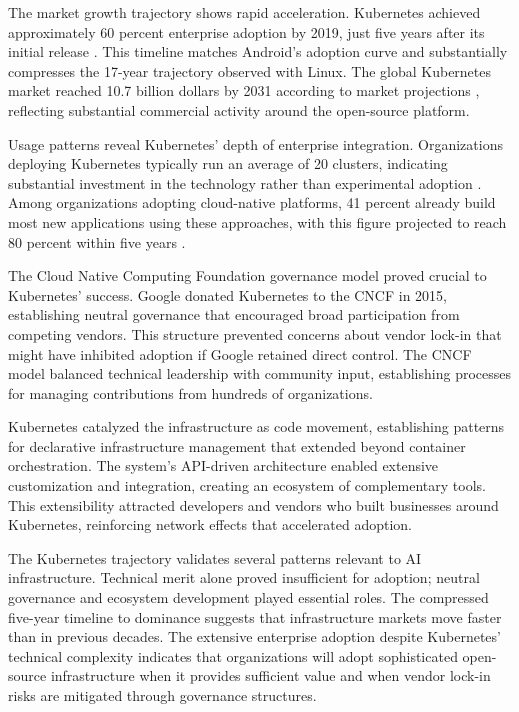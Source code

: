 The market growth trajectory shows rapid acceleration. Kubernetes achieved approximately 60 percent enterprise adoption by 2019, just five years after its initial release \cite{kubernetes_datahub2024}. This timeline matches Android's adoption curve and substantially compresses the 17-year trajectory observed with Linux. The global Kubernetes market reached 10.7 billion dollars by 2031 according to market projections \cite{kubernetes_datahub2024}, reflecting substantial commercial activity around the open-source platform.

Usage patterns reveal Kubernetes' depth of enterprise integration. Organizations deploying Kubernetes typically run an average of 20 clusters, indicating substantial investment in the technology rather than experimental adoption \cite{kubernetes_spectrocloud2024}. Among organizations adopting cloud-native platforms, 41 percent already build most new applications using these approaches, with this figure projected to reach 80 percent within five years \cite{kubernetes_cncf2024}.

The Cloud Native Computing Foundation governance model proved crucial to Kubernetes' success. Google donated Kubernetes to the CNCF in 2015, establishing neutral governance that encouraged broad participation from competing vendors. This structure prevented concerns about vendor lock-in that might have inhibited adoption if Google retained direct control. The CNCF model balanced technical leadership with community input, establishing processes for managing contributions from hundreds of organizations.

Kubernetes catalyzed the infrastructure as code movement, establishing patterns for declarative infrastructure management that extended beyond container orchestration. The system's API-driven architecture enabled extensive customization and integration, creating an ecosystem of complementary tools. This extensibility attracted developers and vendors who built businesses around Kubernetes, reinforcing network effects that accelerated adoption.

The Kubernetes trajectory validates several patterns relevant to AI infrastructure. Technical merit alone proved insufficient for adoption; neutral governance and ecosystem development played essential roles. The compressed five-year timeline to dominance suggests that infrastructure markets move faster than in previous decades. The extensive enterprise adoption despite Kubernetes' technical complexity indicates that organizations will adopt sophisticated open-source infrastructure when it provides sufficient value and when vendor lock-in risks are mitigated through governance structures.

